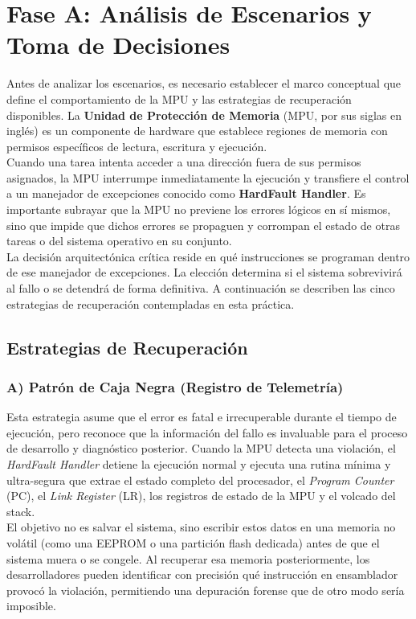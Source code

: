 \documentclass[12pt,letterpaper]{article}
\begin{document}
\section*{Fase A: Análisis de Escenarios y Toma de Decisiones}
Antes de analizar los escenarios, es necesario establecer el marco conceptual que define el comportamiento de la
MPU y las estrategias de recuperación disponibles. La \textbf{Unidad de Protección de Memoria} (MPU, por sus
siglas en inglés) es un componente de hardware que establece regiones de memoria con permisos específicos de
lectura, escritura y ejecución.\\
Cuando una tarea intenta acceder a una dirección fuera de sus permisos asignados, la MPU interrumpe
inmediatamente la ejecución y transfiere el control a un manejador de excepciones conocido como
\textbf{HardFault Handler}. Es importante subrayar que la MPU no previene los errores lógicos en sí mismos, sino
que impide que dichos errores se propaguen y corrompan el estado de otras tareas o del sistema operativo en su
conjunto.\\
 
La decisión arquitectónica crítica reside en qué instrucciones se programan dentro de ese manejador de
excepciones. La elección determina si el sistema sobrevivirá al fallo o se detendrá de forma definitiva.
A continuación se describen las cinco estrategias de recuperación contempladas en esta práctica.
 
\subsection*{Estrategias de Recuperación}
 
\subsubsection*{A) Patrón de Caja Negra (Registro de Telemetría)}
Esta estrategia asume que el error es fatal e irrecuperable durante el tiempo de ejecución, pero reconoce que la
información del fallo es invaluable para el proceso de desarrollo y diagnóstico posterior. Cuando la MPU detecta
una violación, el \textit{HardFault Handler} detiene la ejecución normal y ejecuta una rutina mínima y
ultra-segura que extrae el estado completo del procesador, el \textit{Program Counter} (PC), el
\textit{Link Register} (LR), los registros de estado de la MPU y el volcado del stack.\\
 
El objetivo no es salvar el sistema, sino escribir estos datos en una memoria no volátil (como una EEPROM o una
partición flash dedicada) antes de que el sistema muera o se congele. Al recuperar esa memoria posteriormente,
los desarrolladores pueden identificar con precisión qué instrucción en ensamblador provocó la violación,
permitiendo una depuración forense que de otro modo sería imposible.
 
\end{document}
